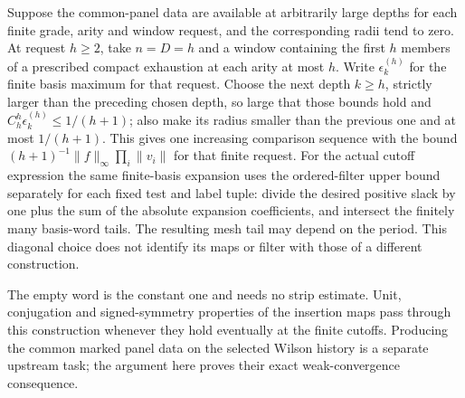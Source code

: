 Suppose the common-panel data are available at arbitrarily large depths for
each finite grade, arity and window request, and the corresponding radii
tend to zero. At request $h\ge2$, take $n=D=h$ and a window containing the
first $h$ members of a prescribed compact exhaustion at each arity at most
$h$. Write $\epsilon_k^{(h)}$ for the finite basis maximum for that request.
Choose the next depth $k\ge h$, strictly larger than the preceding
chosen depth, so large that those bounds hold and
$C_h^h\epsilon_k^{(h)}\le1/(h+1)$; also make its radius smaller than the
previous one and at most $1/(h+1)$. This gives one increasing comparison sequence with the
bound $(h+1)^{-1}\|f\|_\infty\prod_i\|v_i\|$ for that finite request.
For the actual cutoff expression the same finite-basis expansion uses the
ordered-filter upper bound separately for each fixed test and label tuple:
divide the desired positive slack by one plus the sum of the absolute
expansion coefficients, and intersect the finitely many basis-word tails.
The resulting mesh tail may depend on the period. This diagonal choice does
not identify its maps or filter with those of a different construction.

The empty word is the constant one and needs no strip estimate. Unit, conjugation and signed-symmetry
properties of the insertion maps pass through this construction whenever
they hold eventually at the finite cutoffs. Producing the common marked
panel data on the selected Wilson history is a separate upstream task;
the argument here proves their exact weak-convergence consequence.
